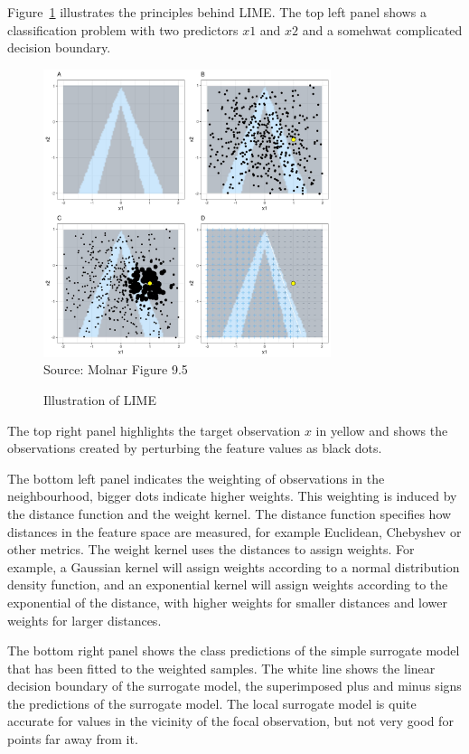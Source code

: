 Figure~\ref{fig:molnar95} illustrates the principles behind LIME. The top left panel shows a classification problem with two predictors $x1$ and $x2$ and a somehwat complicated decision boundary. 

\begin{figure}
\centering
\includegraphics[width=0.75\textwidth]{molnar-9-5.jpeg} \\

\scriptsize Source: Molnar Figure 9.5
\caption{Illustration of LIME}
\label{fig:molnar95}
\end{figure}

The top right panel highlights the target observation $x$ in yellow and shows the observations created by perturbing the feature values as black dots. 

The bottom left panel indicates the weighting of observations in the neighbourhood, bigger dots indicate higher weights. This weighting is induced by the distance function and the weight kernel. The distance function specifies how distances in the feature space are measured, for example Euclidean, Chebyshev or other metrics. The weight kernel uses the distances to assign weights. For example, a Gaussian kernel will assign weights according to a normal distribution density function, and an exponential kernel will assign weights according to the exponential of the distance, with higher weights for smaller distances and lower weights for larger distances. 

The bottom right panel shows the class predictions of the simple surrogate model that has been fitted to the weighted samples. The white line shows the linear decision boundary of the surrogate model, the superimposed plus and minus signs the predictions of the surrogate model. The local surrogate model is quite accurate for values in the vicinity of the focal observation, but not very good for points far away from it.

